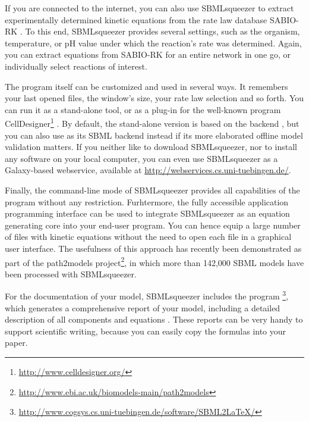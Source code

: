 If you are connected to the internet, you can also use SBMLsqueezer to extract
experimentally determined kinetic equations from the rate law database SABIO-RK
\citep[System for the Analysis of Biochemical Pathways -- Reaction Kinetics,][]{
Wittig2006, Rojas2007, Krebs2007, Wittig2012}.
To this end, SBMLsqueezer provides several settings, such as the organism,
temperature, or pH value under which the reaction's rate was determined. Again,
you can extract equations from SABIO-RK for an entire network in one go, or
individually select reactions of interest.

The program itself can be customized and used in several ways. It remembers your
last opened files, the window's size, your rate law selection and so forth.
You can run it as a stand-alone tool, or as a plug-in for the well-known program
CellDesigner\footnote{\url{http://www.celldesigner.org/}}
\citep{Funahashi2003, Funahashi2006, Funahashi2007a, Funahashi2008}.
By default, the stand-alone version is based on the \JSBML backend 
\citep{Draeger2011b}, but you can also use \libSBML \citep{Bornstein2008} as its
SBML backend instead if its more elaborated offline model validation matters.
If you neither like to download SBMLsqueezer, nor to install any software on
your local computer, you can even use SBMLsqueezer as a Galaxy-based webservice,
available at \url{http://webservices.cs.uni-tuebingen.de/}. 

Finally, the command-line mode of SBMLsqueezer provides all capabilities of the
program without any restriction.
Furhtermore, the fully accessible application programming interface can be used
to integrate SBMLsqueezer as an equation generating core into your end-user
program.
You can hence equip a large number of files with kinetic equations without the
need to open each file in a graphical user interface.
The usefulness of this approach has recently been demonstrated as part of the
path2models project\footnote{\url{http://www.ebi.ac.uk/biomodels-main/path2models}},
in which more than 142,000 SBML models have been processed with SBMLsqueezer.

For the documentation of your model, SBMLsqueezer includes the program
\SBMLLaTeX\footnote{\url{http://www.cogsys.cs.uni-tuebingen.de/software/SBML2LaTeX/}},
which generates a comprehensive report of your model, including a detailed
description of all components and equations \citep{Draeger2009b, Draeger2010a}.
These reports can be very handy to support scientific writing, because you can
easily copy the formulas into your paper.

